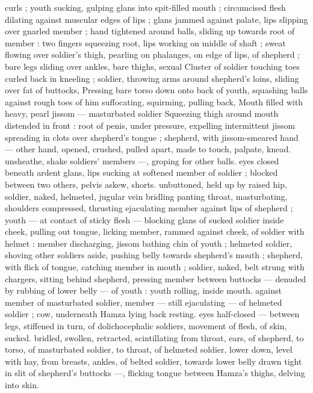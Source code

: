 curls ; youth sucking, gulping glans into spit-filled mouth ; 
circumcised flesh dilating against muscular edges of lips ; glans 
jammed against palate, lips slipping over gnarled member ; hand 
tightened around balls, sliding up towards root of member : two 
fingers squeezing root, lips working on middle of shaft ; sweat 
flowing over soldier's thigh, pearling on phalanges, on edge of lips, 
of shepherd ; bare legs sliding over ankles, bare thighs, sexual 
Cluster of soldier touching toes curled back in kneeling ; soldier, 
throwing arms around shepherd's loins, sliding over fat of buttocks, 
Pressing bare torso down onto back of youth, squashing balls 
against rough toes of him suffocating, squirming, pulling back, 
Mouth filled with heavy, pearl jissom --- masturbated soldier 
Squeezing thigh around mouth distended in front : root of penis, 
under pressure, expelling intermittent jissom spreading in clots over 
shepherd's tongue ; shepherd, with jissom-smeared hand --- other 
hand, opened, crushed, pulled apart, made to touch, palpate, knead. 
unsheathe, shake soldiers' members ---, groping for other balls. 
eyes closed beneath ardent glans, lips sucking at softened member 
of soldier ; blocked between two others, pelvis askew, shorts. 
unbuttoned, held up by raised hip, soldier, naked, helmeted, jugular 
vein bridling panting throat, masturbating, shoulders compressed, 
thrusting ejaculating member against lips of shepherd ; youth --- at 
contact of sticky flesh --- blocking glans of sucked soldier inside 
cheek, pulling out tongue, licking member, rammed against cheek, of 
soldier with helmet : member discharging, jissom bathing chin of 
youth ; helmeted soldier, shoving other soldiers aside, pushing belly 
towards shepherd's mouth ; shepherd, with flick of tongue, catching 
member in mouth ; soldier, naked, belt strung with chargers, sitting 
behind shepherd, pressing member between buttocks --- denuded 
by rubbing of lower belly --- of youth : youth rolling, inside mouth. 
against member of masturbated soldier, member --- still ejaculating 
--- of helmeted soldier ; cow, underneath Hamza lying back resting. 
eyes half-closed --- between legs, stiffened in turn, of 
dolichocephalic soldiers, movement of flesh, of skin, sucked. 
bridled, swollen, retracted, scintillating from throat, ears, of 
shepherd, to torso, of masturbated soldier, to throat, of helmeted 
soldier, lower down, level with hay, from breasts, ankles, of belted 
soldier, towards lower belly drawn tight in slit of shepherd's buttocks 
---, flicking tongue between Hamza's thighs, delving into skin. 
